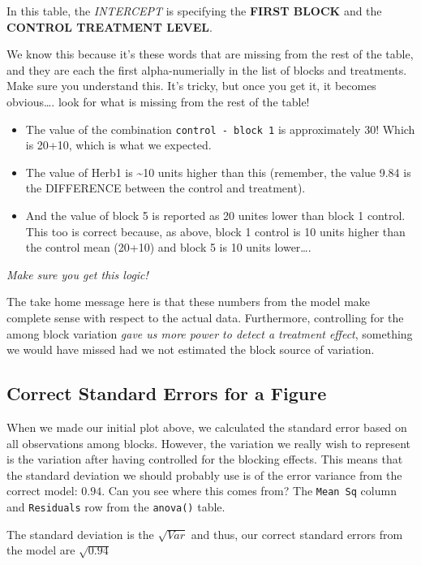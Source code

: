 \documentclass[
]{book}
\providecommand{\tightlist}{%
  \setlength{\itemsep}{0pt}\setlength{\parskip}{0pt}}
\begin{document}
In this table, the \emph{INTERCEPT} is specifying the \textbf{FIRST BLOCK} and the \textbf{CONTROL TREATMENT LEVEL}.

We know this because it's these words that are missing from the rest of the table, and they are each the first alpha-numerially in the list of blocks and treatments. Make sure you understand this. It's tricky, but once you get it, it becomes obvious\ldots. look for what is missing from the rest of the table!

\begin{itemize}
\tightlist
\item
  The value of the combination \texttt{control\ -\ block\ 1} is approximately 30! Which is 20+10, which is what we expected.
\item
  The value of Herb1 is \textasciitilde10 units higher than this (remember, the value 9.84 is the DIFFERENCE between the control and treatment).
\item
  And the value of block 5 is reported as 20 unites lower than block 1 control. This too is correct because, as above, block 1 control is 10 units higher than the control mean (20+10) and block 5 is 10 units lower\ldots.
\end{itemize}

\emph{Make sure you get this logic!}

The take home message here is that these numbers from the model make complete sense with respect to the actual data. Furthermore, controlling for the among block variation \emph{gave us more power to detect a treatment effect}, something we would have missed had we not estimated the block source of variation.

\hypertarget{correct-standard-errors-for-a-figure}{%
\subsection{Correct Standard Errors for a Figure}\label{correct-standard-errors-for-a-figure}}

When we made our initial plot above, we calculated the standard error based on all observations among blocks. However, the variation we really wish to represent is the variation after having controlled for the blocking effects. This means that the standard deviation we should probably use is of the error variance from the correct model: \(0.94\). Can you see where this comes from? The \texttt{Mean\ Sq} column and \texttt{Residuals} row from the \texttt{anova()} table.

The standard deviation is the \(\sqrt{Var}\) and thus, our correct standard errors from the model are \(\sqrt{0.94}\)
\end{document}
